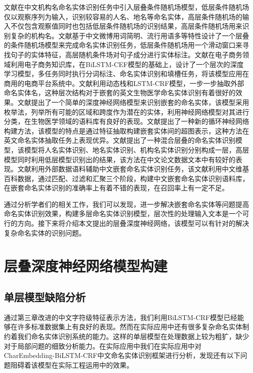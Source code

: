 \documentclass[winfonts,master,oneside,nobackinfo]{njuthesis}
\begin{document}
文献\cite{junsheng}在中文机构名命名实体识别任务中引入层叠条件随机场模型，低层条件随机场仅以观察序列为输入，识别较容易的人名、地名等命名实体，高层条件随机场的输入不仅包含观察值同时也包括低层条件随机场的识别结果，高层条件随机场用来识别复杂的机构名。文献\cite{Yixue}基于中文微博用词简明、流行用语多等特性设计了一个层叠的条件随机场模型来完成命名实体识别任务，低层条件随机场用一个滑动窗口来寻找句子的实体特征，高层随机条件场对句子成分进行实体标注。文献\cite{taobao}在电子商务领域利用电子商务知识库，在BiLSTM-CEF模型的基础上，设计了一个层次的深度学习模型，多任务同时执行分词标注、命名实体识别和填槽任务，将该模型应用在商用的电商平台系统中。文献\cite{Meizhi}利用动态栈和LSTM-CRF模型，一步一步抽取外部命名实体名，这种层次结构对于嵌套的英文生物医学命名实体识别有着很好的效果。文献\cite{Mohammad}提出了一个简单的深度神经网络模型来识别嵌套的命名实体，该模型采用枚举法，列举所有可能的区域和跨度作为潜在的实体，利用神经网络模型对其进行分类，在生物医学领域的语料库有良好的表现。文献\cite{Arzoo}提出了一种新的循环神经网络构建方法，该模型的特点是通过特征抽取构建嵌套实体间的超图表示，这种方法在英文命名实体抽取任务上表现优异。文献\cite{Jia}提出了一种混合层叠的命名实体识别模型，该模型将人名实体识别、地名实体识别、机构名实体识别分别构成一层，高层模型同时利用低层模型识别出的结果，该方法在中文论文数据文本中有较好的表现。文献\cite{yanqun}利用外部数据语料辅助中文嵌套命名实体识别任务，该文献利用中文维基百科数据，通过匹配、过滤和汇聚三个阶段，构建中文嵌套命名实体识别语料库，在嵌套命名实体识别的准确率上有着不错的表现，在召回率上有一定不足。

通过分析学者们的相关工作，我们可以发现，进一步解决嵌套命名实体等问题提高命名实体识别效果，构建多层命名实体识别模型，层次性的处理输入文本是一个可行的方向。接下来将介绍本文提出的层叠深度神经网络，该模型可以有针对的解决复杂命名实体的识别问题。

\section{层叠深度神经网络模型构建}

\subsection{单层模型缺陷分析}

通过第三章改进的中文字符级特征表示方法，我们利用BiLSTM-CRF模型已经能够在许多标准数据集上有良好的表现。然而在实际应用中还有很多复杂命名实体制约着我们命名实体识别系统的能力。这样的单层模型在处理数据上较为粗犷，缺少对于局部问题的细致分析能力。在实际应用中我们在实际应用中对CharEmbedding-BiLSTM-CRF中文命名实体识别框架进行分析，发现还有以下问题阻碍着该模型在实际工程运用中的效果。
\end{document}
